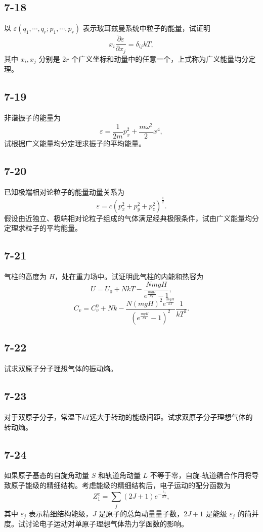 \newpage
\subsection{7-18}
以 $\varepsilon(q_1, \cdots, q_r; p_1, \cdots, p_r)$ 表示玻耳兹曼系统中粒子的能量，试证明
$$\overline{x_i \frac{\partial \varepsilon}{\partial x_j}} = \delta_{ij} kT,$$
其中 $x_i, x_j$ 分别是 $2r$ 个广义坐标和动量中的任意一个，上式称为广义能量均分定理。

\newpage
\subsection{7-19}
非谐振子的能量为
$$\varepsilon = \frac{1}{2m} p_x^2 + \frac{m\omega^2}{2}x^4,$$
试根据广义能量均分定理求振子的平均能量。

\newpage
\subsection{7-20}
已知极端相对论粒子的能量动量关系为
$$\varepsilon = c(p_x^2 + p_y^2 + p_z^2)^{\frac{1}{2}}.$$
假设由近独立、极端相对论粒子组成的气体满足经典极限条件，试由广义能量均分定理求粒子的平均能量。

\newpage
\subsection{7-21}
气柱的高度为 $H$，处在重力场中。试证明此气柱的内能和热容为
$$U = U_0 + NkT - \frac{NmgH}{e^{\frac{mgH}{kT}} - 1},$$
$$C_v = C_v^0 + Nk - \frac{N(mgH)^2 e^{\frac{mgH}{kT}}}{(e^{\frac{mgH}{kT}} - 1)^2} \frac{1}{kT^2}.$$

\newpage
\subsection{7-22}
试求双原子分子理想气体的振动熵。

\newpage
\subsection{7-23}
对于双原子分子，常温下$kT$远大于转动的能级间距。试求双原子分子理想气体的转动熵。

\newpage
\subsection{7-24}
如果原子基态的自旋角动量 $S$ 和轨道角动量 $L$ 不等于零，自旋-轨道耦合作用将导致原子能级的精细结构。考虑能级的精细结构后，电子运动的配分函数为
$$Z_1^e = \sum_j (2J+1) e^{-\frac{\varepsilon_j}{kT}},$$
其中 $\varepsilon_j$ 表示精细结构能级，$J$ 是原子的总角动量量子数，$2J+1$ 是能级 $\varepsilon_j$ 的简并度。试讨论电子运动对单原子理想气体热力学函数的影响。

